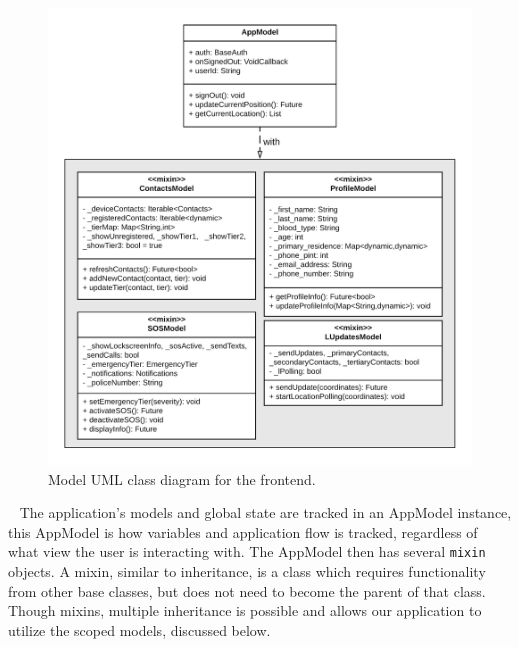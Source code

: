 \documentclass[10pt, a4paper]{article}
\begin{document}
\begin{figure}[H]
\begin{center}
\centerline{
	\includegraphics[scale=.37]{final-diagrams/Models-UML.png}
}
\caption{Model UML class diagram for the frontend.}
\end{center}	
\end{figure}

\par ~ The application's models and global state are tracked in an AppModel instance, this AppModel is how variables and application flow is tracked, regardless of what view the user is interacting with. The AppModel then has several \texttt{mixin} objects. A mixin, similar to inheritance, is a class which requires functionality from other base classes, but does not need to become the parent of that class. Though mixins, multiple inheritance is possible and allows our application to utilize the scoped models, discussed below.
\end{document}
